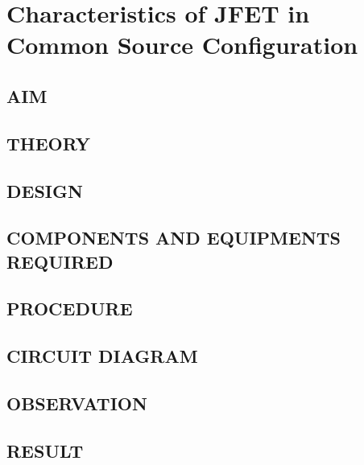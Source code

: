 \chapter[Characteristics of MOSFET in Common Drain Configuration]{Characteristics of JFET in Common Source Configuration}
\section*[AIM]{AIM}
\section*[THEORY]{THEORY}
\section*[DESIGN]{DESIGN}
\section*[COMPONENTS AND EQUIPMENTS REQUIRED]{COMPONENTS AND EQUIPMENTS REQUIRED}
\section*[PROCEDURE]{PROCEDURE}
\section*[CIRCUIT DIAGRAM]{CIRCUIT DIAGRAM}
\section*[OBSERVATION]{OBSERVATION}
\section*[RESULT]{RESULT}

